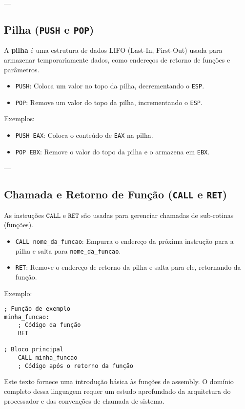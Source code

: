 \documentclass{article}
\begin{document}
---

\subsection{Pilha (\texttt{PUSH} e \texttt{POP})}

A \textbf{pilha} é uma estrutura de dados LIFO (Last-In, First-Out) usada para armazenar temporariamente dados, como endereços de retorno de funções e parâmetros.

\begin{itemize}
    \item \texttt{PUSH}: Coloca um valor no topo da pilha, decrementando o \texttt{ESP}.
    \item \texttt{POP}: Remove um valor do topo da pilha, incrementando o \texttt{ESP}.
\end{itemize}

Exemplos:

\begin{itemize}
    \item \texttt{PUSH EAX}: Coloca o conteúdo de \texttt{EAX} na pilha.
    \item \texttt{POP EBX}: Remove o valor do topo da pilha e o armazena em \texttt{EBX}.
\end{itemize}

---

\subsection{Chamada e Retorno de Função (\texttt{CALL} e \texttt{RET})}

As instruções $\texttt{CALL}$ e $\texttt{RET}$ são usadas para gerenciar chamadas de sub-rotinas (funções).

\begin{itemize}
    \item \texttt{CALL nome\_da\_funcao}: Empurra o endereço da próxima instrução para a pilha e salta para \texttt{nome\_da\_funcao}.
    \item \texttt{RET}: Remove o endereço de retorno da pilha e salta para ele, retornando da função.
\end{itemize}

Exemplo:

\begin{verbatim}
; Função de exemplo
minha_funcao:
    ; Código da função
    RET

; Bloco principal
    CALL minha_funcao
    ; Código após o retorno da função
\end{verbatim}

Este texto fornece uma introdução básica às funções de assembly. O domínio completo dessa linguagem requer um estudo aprofundado da arquitetura do processador e das convenções de chamada de sistema.
\end{document}
